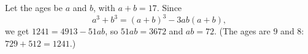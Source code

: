 Let the ages be $a$ and $b$, with $a+b=17$. Since
\[a^3+b^3=(a+b)^3-3ab(a+b),\]
we get $1241=4913-51ab$, so $51ab=3672$ and $ab=\boxed{72}$. (The ages are $9$ and $8$: $729+512=1241$.)
